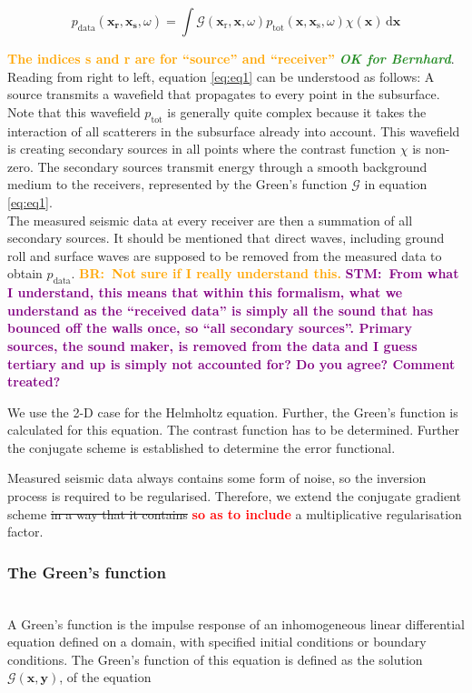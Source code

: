 \documentclass[10pt,a4paper]{article}
\newcommand{\df}[1]{\, \ensuremath{\mbox{d}#1}}
\newcommand{\commentstmtwo}[1]{\textcolor{purple}{\textbf{STM:\ #1}}}
\newcommand{\newstm}[1]{\textcolor{red}{\textbf{#1}}}
\newcommand{\newstmtwo}[1]{\textcolor{orange}{\textbf{#1}}}
\newcommand{\oldstm}[1]{\sout{#1}}
\newcommand{\oldstmtwo}[1]{\xout{#1}}
\newcommand{\brok}{\textcolor{ForestGreen}{\textit{\textbf{OK for Bernhard}}}}
\newcommand{\commentbr}[1]{\textcolor{orange}{\textbf{BR:\ #1}}}
\newcommand{\xs}{\mathbf{x}_\text{s}}
\newcommand{\xr}{\mathbf{x}_\text{r}}
\newcommand{\x}{\mathbf{x}}
\begin{document}
\begin{equation} \label{eq:eq1}
p_\text{data}(\mathbf{x_\text{r}},\mathbf{x_\text{s}},\omega) = \int
\mathcal{G}(\xr, \x, \omega) p_\text{tot}(\x, \xs, \omega) \chi(\x)
\df{\x} \end{equation}

\newstmtwo{The indices \textbf{s} and \textbf{r} are for ``source''
and ``receiver''} \brok.
Reading from right to left, equation \ref{eq:eq1} can be understood as
follows: A source transmits a wavefield that propagates to every point
in the subsurface. Note that this wavefield $p_\text{tot}$ is
generally quite complex because it takes the interaction of all
scatterers in the subsurface already into account. This wavefield is
creating secondary sources in all points where the contrast function
$\chi$ is non-zero. The secondary sources transmit energy through a
smooth background medium to the receivers, represented by the Green's
function $\mathcal{G}$ in equation \ref{eq:eq1}.\\ %
The measured seismic data at every receiver are then a summation of
all secondary sources. It should be mentioned that direct waves,
including ground roll and surface waves are supposed to be removed
from the measured data to obtain $p_\text{data}$.
\commentbr{Not sure if I really understand this.}
\commentstmtwo{From what I understand, this means that within this formalism,
what we understand as the ``received data'' is simply all the sound that has bounced off the walls once,
so ``all secondary sources''. Primary sources, the sound maker, is removed from the data
and I guess tertiary and up is simply not accounted for?
Do you agree? Comment treated?}
\newline

We use the 2-D case for the Helmholtz equation. Further, the Green's
function is calculated for this equation. The contrast function has to
be determined. Further the conjugate scheme is established to
determine the error functional.
\newline

Measured seismic data always contains some form of noise, so the
inversion process is required to be regularised. Therefore, we extend
the conjugate gradient scheme \oldstm{in a way that it contains}
\newstm{so as to include} a multiplicative regularisation factor.

\subsubsection{The Green's function}
\oldstmtwo{\textbf{2.1. The Green's function}}\\
A Green's function is the impulse response of an inhomogeneous linear
differential equation defined on a domain, with specified initial
conditions or boundary conditions.
The Green's function of this equation is defined as the solution
$\mathcal{G}(\mathbf{x}, \mathbf{y})$, of the equation
\end{document}

